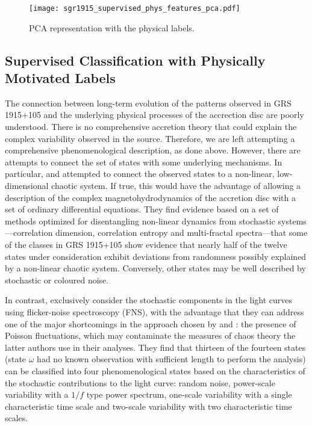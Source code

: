 \documentclass[12pt]{emulateapj}
\begin{document}
\begin{figure}[htbp]
\begin{center}
\texttt{[image: sgr1915\_supervised\_phys\_features\_pca.pdf]}
\caption{PCA representation with the physical labels.} 
\label{fig:pca_physical}
\end{center}
\end{figure}


\subsection{Supervised Classification with Physically Motivated Labels}

The connection between long-term evolution of the patterns observed in GRS 1915+105 and the underlying physical processes of the 
accrection disc are poorly understood. There is no comprehensive accretion theory that could explain the complex variability observed in the source. 
Therefore, we are left attempting a comprehensive phenomenological description, as done above. However, there are attempts to connect the set of 
states with some underlying mechanisms. In particular, \citet{misra2004,2006} and \citet{harikrishnan2011} attempted to connect the observed states to 
a non-linear, low-dimensional chaotic system. If true, this would have the advantage of allowing a description of the complex magnetohydrodynamics of the 
accretion disc with a set of ordinary differential equations. They find evidence based on a set of methods optimized for disentangling non-linear dynamics from 
stochastic systems---correlation dimension, correlation entropy and multi-fractal spectra---that some of the classes in GRS 1915+105 show evidence that nearly 
half of the twelve states under consideration exhibit deviations from randomness possibly explained by a non-linear chaotic system. Conversely, other states may 
be well described by stochastic or coloured noise.

In contrast, \citet{polyakov2012} exclusively consider the stochastic components in the light curves using 
flicker-noise spectroscopy (FNS), with the advantage that they can address one of the major shortcomings in the approach chosen by \citet{misra2004,2006} and 
\citet{harikrishnan2011}: the presence of Poisson fluctuations, which may contaminate the measures of chaos theory the latter authors use in their analyses.
They find that thirteen of the fourteen states (state $\omega$ had no known observation with sufficient length to perform the analysis) can be classified into 
four phenomenological states based on the characteristics of the stochastic contributions to the light curve: random noise, power-scale variability with a $1/f$ type 
power spectrum, one-scale variability with a single characteristic time scale and two-scale variability with two characteristic time scales. 
\end{document}
